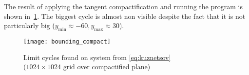 
The result of applying the tangent compactification and running the program is shown
in~\cref{fig:bounding_compact}. The biggest cycle is almost non visible despite the fact that it is not particularly big ($y_{\min} \approx -60, y_{\max} \approx 30$).

\begin{figure}[H]
    \centering
    \texttt{[image: bounding\_compact]}
    \caption{Limit cycles found on system from \cref{eq:kuznetsov} \\
        ($1024 \times 1024$ grid over compactified plane)
    }%
    \label{fig:bounding_compact}
\end{figure}
